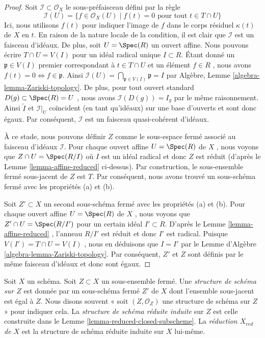 \begin{proof}
Soit  $\mathcal{I} \subset \mathcal{O}_X$  le sous-préfaisceau défini par la règle
$$
\mathcal{I}(U) = \{f \in \mathcal{O}_X(U) \mid
f(t) = 0\text{ pour tout }t \in T\cap U\}
$$
Ici, nous utilisons  $f(t)$  pour indiquer l'image de  $f$  dans le
corps résiduel  $\kappa(t)$  de  $X$  en  $t$. En raison de la
nature locale de la condition, il est clair que  $\mathcal{I}$  est un faisceau
d'idéaux. De plus, soit  $U = \Spec(R)$  un ouvert affine. Nous pouvons écrire
 $T \cap U = V(I)$  pour un idéal radical unique  $I \subset R$. Étant donné un
 $\mathfrak p \in V(I)$  premier correspondant à  $t \in T \cap U$  et un élément  $f \in R$ , nous
avons  $f(t) = 0 \Leftrightarrow f \in \mathfrak p$. Ainsi  $\mathcal{I}(U) = \bigcap_{\mathfrak p \in V(I)} \mathfrak p
= I$  par Algèbre, Lemme  \ref{algebra-lemma-Zariski-topology}. De plus,
pour tout ouvert standard  $D(g) \subset \Spec(R) = U$ , nous avons  $\mathcal{I}(D(g)) = I_g$  par le même
raisonnement. Ainsi  $\widetilde I$  et  $\mathcal{I}|_U$  coïncident (en tant qu'idéaux)
sur une base d'ouverts et sont donc égaux. Par conséquent,  $\mathcal{I}$  est un
faisceau quasi-cohérent d'idéaux.

\medskip\noindent
À ce stade, nous pouvons définir  $Z$  comme le sous-espace fermé associé
au faisceau d'idéaux  $\mathcal{I}$. Pour chaque ouvert affine  $U = \Spec(R)$  de
 $X$ , nous voyons que  $Z \cap U = \Spec(R/I)$  où  $I$  est un idéal radical et
donc  $Z$  est réduit (d'après le Lemme  \ref{lemma-affine-reduced}  ci-dessus). Par
construction, le sous-ensemble fermé sous-jacent de  $Z$  est  $T$.
Par conséquent, nous avons trouvé un sous-schéma fermé avec les propriétés (a) et
(b).

\medskip\noindent
Soit  $Z' \subset X$  un second sous-schéma fermé avec les propriétés (a) et (b). Pour
chaque ouvert affine  $U = \Spec(R)$  de  $X$ , nous voyons que  $Z' \cap U = \Spec(R/I')$ 
pour un certain idéal  $I' \subset R$. D'après le Lemme  \ref{lemma-affine-reduced} , l'anneau
 $R/I'$  est réduit et donc  $I'$  est radical. Puisque  $V(I') = T \cap U = V(I)$ ,
nous en déduisons que  $I = I'$  par le Lemme d'Algèbre  \ref{algebra-lemma-Zariski-topology}. Par
conséquent,  $Z'$  et  $Z$  sont définis par le même faisceau
d'idéaux et donc sont égaux.
\end{proof}

\begin{definition}
\label{definition-reduced-induced-scheme}
Soit $X$ un schéma. Soit $Z \subset X$ un sous-ensemble fermé.
Une {\it structure de schéma sur $Z$}  est donnée
par un sous-schéma fermé  $Z'$  de  $X$ dont l'ensemble sous-jacent
est égal à $Z$. Nous disons souvent « soit  $(Z, \mathcal{O}_Z)$ une
structure de schéma sur $Z$ » pour indiquer cela. La
 {\it structure de schéma réduite
induite} sur $Z$  est celle construite dans le Lemme  \ref{lemma-reduced-closed-subscheme}.
La  {\it réduction $X_{red}$  de  $X$} est la
structure de schéma réduite induite sur $X$  lui-même.
\end{definition}

